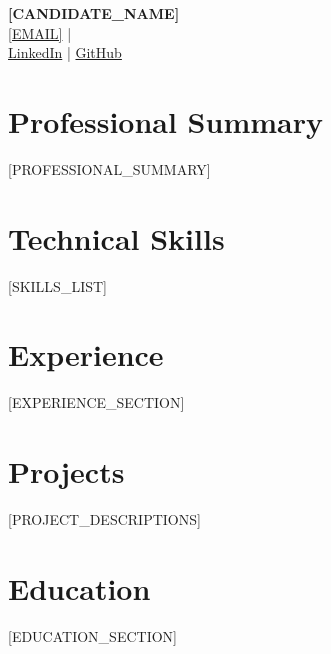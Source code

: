 \documentclass[11pt,a4paper]{article}
\begin{document}
\pagestyle{empty}

\begin{center}
    {\LARGE \textbf{[CANDIDATE_NAME]}}\\[4pt]
    \href{mailto:[EMAIL]}{[EMAIL]} \quad | \quad [PHONE] \\
    \href{[LINKEDIN]}{LinkedIn} \quad | \quad \href{[GITHUB]}{GitHub}
\end{center}

\vspace{4pt}

\section{Professional Summary}
[PROFESSIONAL_SUMMARY]

\section{Technical Skills}
[SKILLS_LIST]

\section{Experience}
[EXPERIENCE_SECTION]

\section{Projects}
[PROJECT_DESCRIPTIONS]

\section{Education}
[EDUCATION_SECTION]
\end{document}
